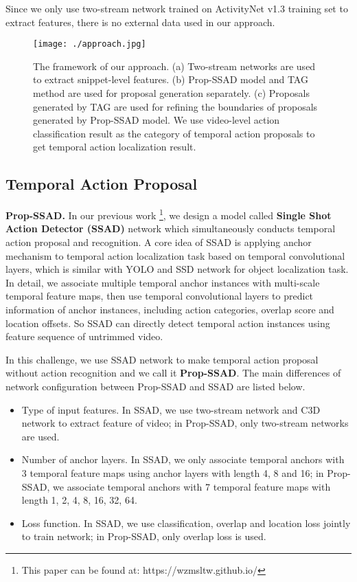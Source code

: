 \documentclass[10pt,twocolumn,letterpaper]{article}
\begin{document}
Since we only use two-stream network  trained on ActivityNet v1.3 training set to extract features, there is no external data used in our approach.

\begin{figure*}
\centering

\begin{minipage}[b]{1.0\linewidth}
  \centering
  \centerline{\texttt{[image: ./approach.jpg]}}
\medskip
\end{minipage}

\caption{The framework of our approach. (a) Two-stream networks are used to extract snippet-level features. (b) Prop-SSAD model and TAG method are used for proposal generation separately. (c) Proposals generated by TAG are used for refining the boundaries of proposals generated by Prop-SSAD model. We use video-level action classification result as the category of temporal action proposals to get temporal action localization result.
}
\label{approach}

\end{figure*}

\subsection{Temporal Action Proposal}

{\bf Prop-SSAD.} In our previous work \cite{ssad} \footnote{This paper can be found at: https://wzmsltw.github.io/}, we design a model called {\bf Single Shot Action Detector  (SSAD)} network which simultaneously conducts temporal action proposal and recognition. A core idea of SSAD is applying anchor mechanism to temporal action localization task based on temporal convolutional layers, which is similar with YOLO \cite{redmon2016you} and SSD \cite{liu2016ssd} network for object localization task. In detail, we associate multiple temporal anchor instances with multi-scale temporal feature maps, then use temporal convolutional layers to predict information of anchor instances, including action categories, overlap score and location offsets. So SSAD can directly detect temporal action instances using feature sequence of untrimmed video.


In this challenge, we use SSAD network to make temporal action proposal without action recognition and we call it {\bf Prop-SSAD}. The main differences of network configuration between Prop-SSAD and SSAD are listed below.

\begin{itemize}  
\item Type of input features. In SSAD, we use two-stream network and C3D network to extract feature of video; in Prop-SSAD, only two-stream networks are used.
\item Number of anchor layers. In SSAD, we only associate temporal anchors with 3 temporal feature maps using anchor layers with length 4, 8 and 16; in  Prop-SSAD, we associate temporal anchors with 7 temporal feature maps with length 1, 2, 4, 8, 16, 32, 64.
\item Loss function. In SSAD, we use classification, overlap and location loss jointly to train network; in Prop-SSAD, only overlap loss is used.
\end{itemize}  
\end{document}
